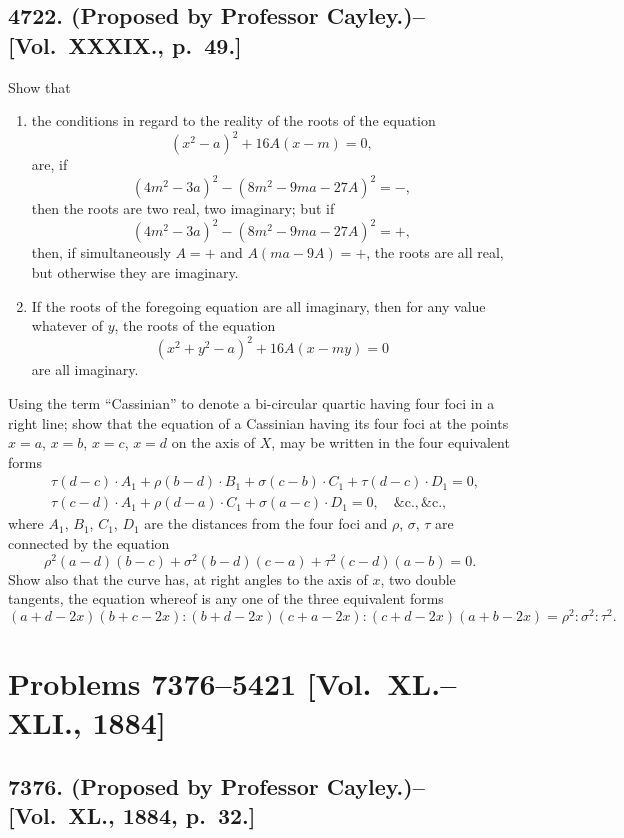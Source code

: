 \documentclass[11pt,a4paper]{article}
\theoremstyle{definition}
\begin{document}
\subsection*{4722. (Proposed by Professor Cayley.)\---[Vol.~XXXIX., p.~49.]}

Show that
\begin{enumerate}[label=\arabic*.]
\item the conditions in regard to the reality of the roots of the equation
\[
(x^2-a)^2 + 16A(x-m) = 0,
\]
are, if
\[
(4m^2-3a)^2 - (8m^2-9ma-27A)^2 = -,
\]
then the roots are two real, two imaginary; but if
\[
(4m^2-3a)^2 - (8m^2-9ma-27A)^2 = +,
\]
then, if simultaneously $A=+$ and $A(ma-9A)=+$, the roots are all real, but otherwise they are imaginary.

\item If the roots of the foregoing equation are all imaginary, then for any value whatever of $y$, the roots of the equation
\[
(x^2+y^2-a)^2 + 16A(x-my) = 0
\]
are all imaginary.
\end{enumerate}

Using the term ``Cassinian'' to denote a bi-circular quartic having four foci in a right line; show that the equation of a Cassinian having its four foci at the points $x=a$, $x=b$, $x=c$, $x=d$ on the axis of $X$, may be written in the four equivalent forms
\[
\begin{aligned}
&\tau(d-c)\cdot A_1 + \rho(b-d)\cdot B_1 + \sigma(c-b)\cdot C_1 + \tau(d-c)\cdot D_1 = 0, \\
&\tau(c-d)\cdot A_1 + \rho(d-a)\cdot C_1 + \sigma(a-c)\cdot D_1 = 0, \quad \&\text{c.}, \&\text{c.},
\end{aligned}
\]
where $A_1$, $B_1$, $C_1$, $D_1$ are the distances from the four foci and $\rho$, $\sigma$, $\tau$ are connected by the equation
\[
\rho^2(a-d)(b-c) + \sigma^2(b-d)(c-a) + \tau^2(c-d)(a-b) = 0.
\]
Show also that the curve has, at right angles to the axis of $x$, two double tangents, the equation whereof is any one of the three equivalent forms
\[
(a+d-2x)(b+c-2x) : (b+d-2x)(c+a-2x) : (c+d-2x)(a+b-2x) = \rho^2 : \sigma^2 : \tau^2.
\]

\newpage

\section*{Problems 7376--5421 [Vol.~XL.--XLI., 1884]}

\subsection*{7376. (Proposed by Professor Cayley.)\---[Vol.~XL., 1884, p.~32.]}
\end{document}
